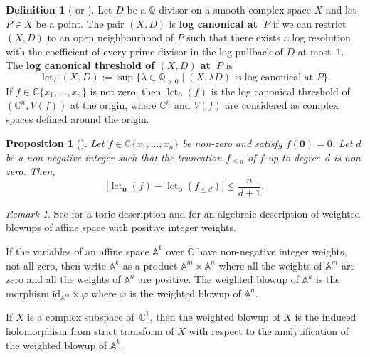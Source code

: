 \documentclass[a4paper, 12pt, oneside]{article}
\theoremstyle{plain}
\newtheorem{proposition}[theorem]{Proposition}
\theoremstyle{definition}
\newtheorem{definition}[theorem]{Definition}
\theoremstyle{remark}
\newtheorem{remark}[theorem]{Remark}
\numberwithin{theorem}{section}
\numberwithin{table}{section}
\numberwithin{equation}{theorem}
\newcommand*\abs[1]{\left\lvert #1 \right\rvert}
\begin{document}
\begin{definition}[{\cite[Definition 3.5]{Kol97} or \cite[Definition~2.34]{KM98}}] \label{def:lct}
Let $D$ be a $\mathbb Q$-divisor on a smooth complex space $X$ and let $P \in X$ be a point. The pair $(X, D)$ is \textbf{log canonical at~$P$} if we can restrict $(X, D)$ to an open neighbourhood of $P$ such that there exists a log resolution with the coefficient of every prime divisor in the log pullback of $D$ at most~$1$. The \textbf{log canonical threshold of $(X, D)$ at~$P$} is
\[
\operatorname{lct}_P(X, D) := \operatorname{sup}\bigl\{ \lambda \in \mathbb Q_{>0} \;\big|\; (X, \lambda D) \text{ is log canonical at~$P$} \bigr\}.
\]
If $f \in \mathbb C\{x_1, \ldots, x_n\}$ is not zero, then $\operatorname{lct}_{\bm 0}(f)$ is the log canonical threshold of $(\mathbb C^n, V(f))$ at the origin, where $\mathbb C^n$ and $V(f)$ are considered as complex spaces defined around the origin.
\end{definition}

\begin{proposition}[{\cite[Proposition~8.19]{Kol97}}] \label{thm:approximation}
Let $f \in \mathbb C\{x_1, \ldots, x_n\}$ be non-zero and satisfy $f(\bm 0) = 0$. Let $d$ be a non-negative integer such that the truncation $f_{\leq d}$ of $f$ up to degree~$d$ is non-zero. Then,
\[
\abs{\operatorname{lct}_{\bm 0}(f) - \operatorname{lct}_{\bm 0}(f_{\leq d})} \leq \frac{n}{d+1}.
\]
\end{proposition}

\begin{remark}
See \cite[Proposition-Definition~10.3]{KM92} for a toric description and \cite[Definition~4.56]{KM98} for an algebraic description of weighted blowups of affine space with positive integer weights.

If the variables of an affine space $\mathbb A^k$ over $\mathbb C$ have non-negative integer weights, not all zero, then write $\mathbb A^k$ as a product $\mathbb A^m \times \mathbb A^n$ where all the weights of $\mathbb A^m$ are zero and all the weights of $\mathbb A^n$ are positive. The weighted blowup of $\mathbb A^k$ is the morphism $\mathrm{id}_{\mathbb A^m} \times \varphi$ where $\varphi$ is the weighted blowup of $\mathbb A^n$.

If $X$ is a complex subspace of~$\mathbb C^k$, then the weighted blowup of $X$ is the induced holomorphism from strict transform of $X$ with respect to the analytification of the weighted blowup of $\mathbb A^k$.
\end{remark}
\end{document}
